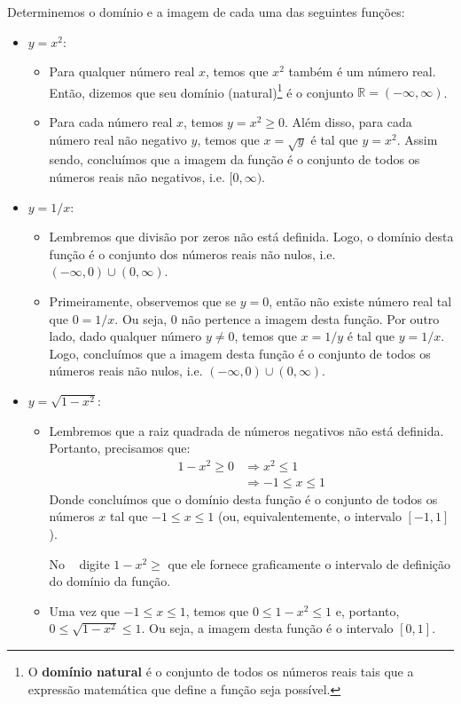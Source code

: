 \documentclass[../main.tex]{subfiles}
\begin{document}
\begin{ex}
  Determinemos o domínio e a imagem de cada uma das seguintes funções:
  \begin{itemize}
  \item $y=x^2$:
    \begin{itemize}
    \item Para qualquer número real $x$, temos que $x^2$ também é um número real. Então, dizemos que seu domínio (natural)\footnote{O \textbf{domínio natural} é o conjunto de todos os números reais tais que a expressão matemática que define a função seja possível.} é o conjunto $\mathbb{R} = (-\infty, \infty)$.
    \item Para cada número real $x$, temos $y=x^2\geq0$. Além disso, para cada número real não negativo $y$, temos que $x=\sqrt{y}$ é tal que $y=x^2$. Assim sendo, concluímos que a imagem da função é o conjunto de todos os números reais não negativos, i.e. $[0, \infty)$.
    \end{itemize}
  \item $y=1/x$:
    \begin{itemize}
    \item Lembremos que divisão por zeros não está definida. Logo, o domínio desta função é o conjunto dos números reais não nulos, i.e. $(-\infty, 0)\cup (0, \infty)$.
    \item Primeiramente, observemos que se $y=0$, então não existe número real tal que $0=1/x$. Ou seja, $0$ não pertence a imagem desta função. Por outro lado, dado qualquer número $y\neq 0$, temos que $x=1/y$ é tal que $y=1/x$. Logo, concluímos que a imagem desta função é o conjunto de todos os números reais não nulos, i.e. $(-\infty, 0)\cup (0, \infty)$.
    \end{itemize}
  \item $y=\sqrt{1-x^2}$:   
    \begin{itemize}
    \item Lembremos que a raiz quadrada de números negativos não está definida. Portanto, precisamos que:
      \begin{align*}
        1-x^2\geq 0 &\Rightarrow x^2 \leq 1\\
                    &\Rightarrow -1 \leq x \leq 1
      \end{align*}
      Donde concluímos que o domínio desta função é o conjunto de todos os números $x$ tal que $-1\leq x \leq 1$ (ou, equivalentemente, o intervalo $[-1, 1]$).
      
      
 No \geogebra~ digite $1-x^2\geq $ que ele fornece graficamente o intervalo de definição do domínio da função.
\    \item Uma vez que $-1 \leq x \leq 1$, temos que $0 \leq 1-x^2 \leq 1$ e, portanto, $0\leq \sqrt{1-x^2} \leq 1$. Ou seja, a imagem desta função é o intervalo $[0, 1]$.
    \end{itemize}
  \end{itemize}
\end{ex}
\end{document}
